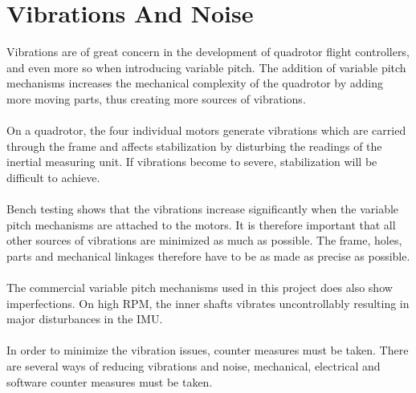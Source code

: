 \section{Vibrations And Noise}
Vibrations are of great concern in the development of quadrotor flight controllers, and even more so when introducing variable pitch. The addition of variable pitch mechanisms increases the mechanical complexity of the quadrotor by adding more moving parts, thus creating more sources of vibrations.
\\
\\
On a quadrotor, the four individual motors generate vibrations which are carried through the frame and affects stabilization by disturbing the readings of the inertial measuring unit. If vibrations become to severe, stabilization will be difficult to achieve.
\\
\\
Bench testing shows that the vibrations increase significantly when the variable pitch mechanisms are attached to the motors. It is therefore important that all other sources of vibrations are minimized as much as possible. The frame, holes, parts and mechanical linkages therefore have to be as made as precise as possible. 
\\
\\
The commercial variable pitch mechanisms used in this project does also show imperfections. On high RPM, the inner shafts vibrates uncontrollably resulting in major disturbances in the IMU.
\\ 
\\
In order to minimize the vibration issues, counter measures must be taken. There are several ways of reducing vibrations and noise, mechanical, electrical and software counter measures must be taken.



